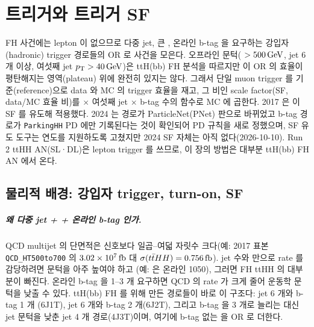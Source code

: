 \chapter{트리거와 트리거 SF}\label{ch:trigger}

FH 사건에는 lepton 이 없으므로 다중 jet, 큰 \HT, 온라인 b-tag 을 요구하는 강입자(hadronic) trigger 경로들의
OR 로 사건을 모은다. 오프라인 문턱(\HT{} $>500\,\mathrm{GeV}$, jet 6 개 이상, 여섯째 jet $p_{\mathrm{T}}>40\,\mathrm{GeV}$)은 ttH(bb) FH 분석을
따르지만 이 OR 의 효율이 평탄해지는 영역(plateau) 위에 완전히 있지는 않다. 그래서 단일 muon trigger 를 기준(reference)으로
data 와 MC 의 trigger 효율을 재고, 그 비인 scale factor(SF, data/MC 효율 비)를 \HT{} $\times$ 여섯째 jet \pt{} $\times$ b-tag
수의 함수로 MC 에 곱한다. 2017 은 이 SF 를 유도해 적용했다. 2024 는 경로가 ParticleNet(PNet) 판으로 바뀌었고 b-tag 경로가
\texttt{ParkingHH} PD 에만 기록된다는 것이 확인되어 PD 규칙을 새로 정했으며, SF 유도 도구는 연도를 지원하도록 고쳤지만 2024 SF
자체는 아직 없다(2026-10-10). Run 2 ttHH AN(SL·DL)은 lepton trigger 를 쓰므로, 이 장의 방법은 대부분 ttH(bb) FH AN 에서 온다.

\section{물리적 배경: 강입자 trigger, turn-on, SF}\label{sec:trigger-theory}

\paragraph{왜 다중 jet + \HT{} + 온라인 b-tag 인가.}
QCD multijet 의 단면적은 신호보다 일곱–여덟 자릿수 크다(예: 2017 표본 \texttt{QCD\_HT500to700} 의 $3.02\times10^{7}\,\mathrm{fb}$ 대 $\sigma(t\bar{t}HH)=0.756\,\mathrm{fb}$). jet 수와 \HT{} 만으로 rate 를 감당하려면 문턱을 아주 높여야 하고
(예:  은 온라인 \HT{} 1050\GeV), 그러면 FH ttHH 의 대부분이 빠진다. 온라인 b-tag 을 1–3 개 요구하면
QCD 의 rate 가 크게 줄어 운동학 문턱을 낮출 수 있다. ttH(bb) FH 를 위해 만든 경로들이 바로 이 구조다: jet 6 개와 b-tag 1 개
(6J1T), jet 6 개와 b-tag 2 개(6J2T), 그리고 b-tag 을 3 개로 늘리는 대신 jet 문턱을 낮춘 jet 4 개 경로(4J3T)이며, 여기에 b-tag
없는  을 OR 로 더한다.

